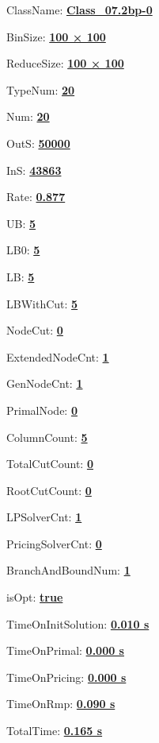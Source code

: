 \documentclass[11pt]{article}
\begin{document}
\pagestyle{empty}


ClassName: \underline{\textbf{Class_07.2bp-0}}
\par
BinSize: \underline{\textbf{100 × 100}}
\par
ReduceSize: \underline{\textbf{100 × 100}}
\par
TypeNum: \underline{\textbf{20}}
\par
Num: \underline{\textbf{20}}
\par
OutS: \underline{\textbf{50000}}
\par
InS: \underline{\textbf{43863}}
\par
Rate: \underline{\textbf{0.877}}
\par
UB: \underline{\textbf{5}}
\par
LB0: \underline{\textbf{5}}
\par
LB: \underline{\textbf{5}}
\par
LBWithCut: \underline{\textbf{5}}
\par
NodeCut: \underline{\textbf{0}}
\par
ExtendedNodeCnt: \underline{\textbf{1}}
\par
GenNodeCnt: \underline{\textbf{1}}
\par
PrimalNode: \underline{\textbf{0}}
\par
ColumnCount: \underline{\textbf{5}}
\par
TotalCutCount: \underline{\textbf{0}}
\par
RootCutCount: \underline{\textbf{0}}
\par
LPSolverCnt: \underline{\textbf{1}}
\par
PricingSolverCnt: \underline{\textbf{0}}
\par
BranchAndBoundNum: \underline{\textbf{1}}
\par
isOpt: \underline{\textbf{true}}
\par
TimeOnInitSolution: \underline{\textbf{0.010 s}}
\par
TimeOnPrimal: \underline{\textbf{0.000 s}}
\par
TimeOnPricing: \underline{\textbf{0.000 s}}
\par
TimeOnRmp: \underline{\textbf{0.090 s}}
\par
TotalTime: \underline{\textbf{0.165 s}}
\par
\newpage


\end{document}

